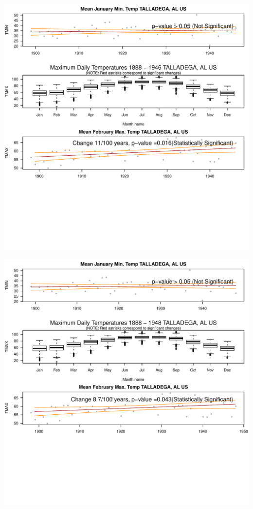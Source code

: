 \documentclass{article}\usepackage[]{graphicx}\usepackage[]{color}
\makeatletter
\def\maxwidth{ %
  \ifdim\Gin@nat@width>\linewidth
    \linewidth
  \else
    \Gin@nat@width
  \fi
}
\newenvironment{knitrout}{}{} %
\makeatother
\begin{document}
\begin{knitrout}
\includegraphics[width=\maxwidth]{figure/static_template-19} 

\includegraphics[width=\maxwidth]{figure/static_template-20} 


\end{knitrout}
\end{document}
